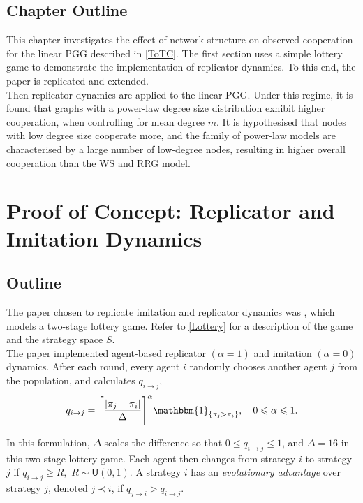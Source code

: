 \subsection{Chapter Outline}
This chapter investigates the effect of network structure on observed cooperation for the linear PGG described in \ref{ToTC}. The first section uses a simple lottery game to demonstrate the implementation of replicator dynamics. To this end, the paper \cite{RN30} is replicated and extended. \\

Then replicator dynamics are applied to the linear PGG. Under this regime, it is found that graphs with a power-law degree size distribution exhibit higher cooperation, when controlling for mean degree $m$. It is hypothesised that nodes with low degree size cooperate more, and the family of power-law models are characterised by a large number of low-degree nodes, resulting in higher overall cooperation than the WS and RRG model. \\
\section{Proof of Concept: Replicator and Imitation Dynamics} \label{Lottery_Me}
\subsection{Outline}
The paper chosen to replicate imitation and replicator dynamics was \cite{RN30}, which models a two-stage lottery game. Refer to \ref{Lottery} for a description of the game and the strategy space $S$. \\

The paper implemented agent-based replicator $(\alpha = 1)$ and imitation $(\alpha = 0)$ dynamics. After each round, every agent $i$ randomly chooses another agent $j$ from the population, and calculates $q_{i\to j}$, \\

\begin{equation} \label{rep}
q_{i\to j} = \Bigg[ \frac{|\pi_j - \pi_i|}{\Delta} \Bigg]^\alpha \mathbbm{1}_{\{\pi_j>\pi_i\}}, \quad  0 \leq \alpha \leq 1.\end{equation} 

In this formulation, $\Delta$ scales the difference so that $0 \leq q_{i\to j} \leq 1$, and $\Delta = 16$ in this two-stage lottery game. Each agent then changes from strategy $i$ to strategy $j$ if $q_{i\to j} \geq R,$ $R  \sim \mathsf{U}(0,1)$. A strategy $i$ has an \emph{evolutionary advantage} over strategy $j$, denoted $j \prec i$, if $q_{j \to i} >q_{i \to j}$.    \\

